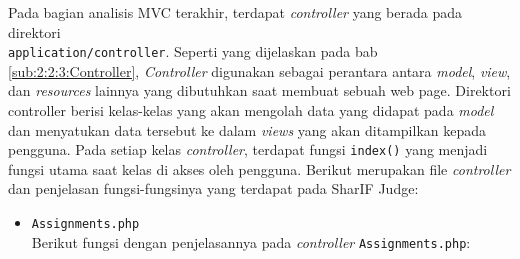 Pada bagian analisis MVC terakhir, terdapat \textit{controller} yang berada pada direktori \\ \verb|application/controller|. Seperti yang dijelaskan pada bab \ref{sub:2:2:3:Controller}, \textit{Controller} digunakan sebagai perantara antara \textit{model}, \textit{view}, dan \textit{resources} lainnya yang dibutuhkan saat membuat sebuah web page. Direktori controller berisi kelas-kelas yang akan mengolah data yang didapat pada \textit{model} dan menyatukan data tersebut ke dalam \textit{views} yang akan ditampilkan kepada pengguna. Pada setiap kelas \textit{controller}, terdapat fungsi \verb|index()| yang menjadi fungsi utama saat kelas di akses oleh pengguna. Berikut merupakan file \textit{controller} dan penjelasan fungsi-fungsinya yang terdapat pada SharIF Judge:

\begin{itemize}
	\item \verb|Assignments.php| \\
	      Berikut fungsi dengan penjelasannya pada \textit{controller} \verb|Assignments.php|:


\end{itemize}
